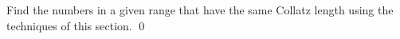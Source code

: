 \documentclass[a4paper,11pt]{article}
\begin{document}
\begin{uexercise}

Find the numbers in a given range that have the same Collatz length using the techniques of this section.
\qed
\end{uexercise}

% 
% 
% 
% 
% 
% 
% 
% 
% 
% 
\end{document}
